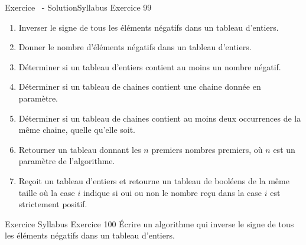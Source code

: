 \begin{frame}[allowframebreaks]{Exercice \theexercice~- Solution}{Syllabus Exercice 99}
    \begin{enumerate}
        \item
        Inverser le signe de tous les éléments négatifs dans un tableau d’entiers.
        
        \item
        Donner le nombre d’éléments négatifs dans un tableau d’entiers.
        
        \item
        Déterminer si un tableau d’entiers contient au moins un nombre négatif.
        
        \item
        Déterminer si un tableau de chaines contient
        une chaine donnée en paramètre.
        
        \item
        Déterminer si un tableau de chaines contient
        au moins deux occurrences de la même chaine,
        quelle qu’elle soit.
        
        \item
        Retourner un tableau donnant les $n$ premiers nombres premiers,
        où $n$ est un paramètre de l’algorithme.
        
        \item
        Reçoit un tableau d’entiers
        et retourne un tableau de booléens de la même taille
        où la case $i$ indique si oui ou non
        le nombre reçu dans la case $i$ est strictement positif.
        
    \end{enumerate}

\end{frame}

\begin{frame}{Exercice \theexercice}{Syllabus Exercice 100}
    Écrire un algorithme qui
    inverse le signe de tous les éléments négatifs dans un tableau d’entiers.
\end{frame}

